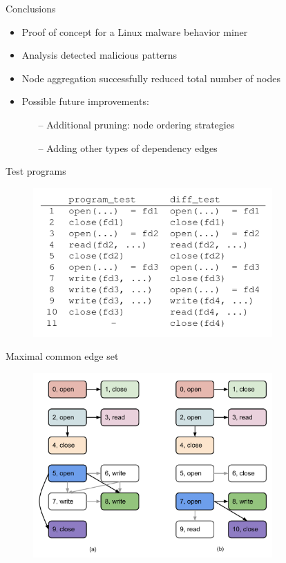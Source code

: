 \documentclass{beamer}
\begin{document}
\begin{frame}{Conclusions}
  \begin{itemize}
    \item Proof of concept for a Linux malware behavior miner
    \item Analysis detected malicious patterns
    \item Node aggregation successfully reduced total number of nodes
    \item Possible future improvements:
    \begin{itemize}
      \item[--] Additional pruning: node ordering strategies
      \item[--] Adding other types of dependency edges
    \end{itemize}
  \end{itemize}
\end{frame}


\begin{frame}{Test programs}
  \begin{figure}[p]
    \includegraphics[width=3.6in]{img/programs.png}
    \end{figure}
\end{frame}

\begin{frame}{Maximal common edge set}
  \begin{figure}[p]
    \includegraphics[width=3.6in]{img/max-common-edge-set.pdf}
    \end{figure}
\end{frame}
\end{document}
